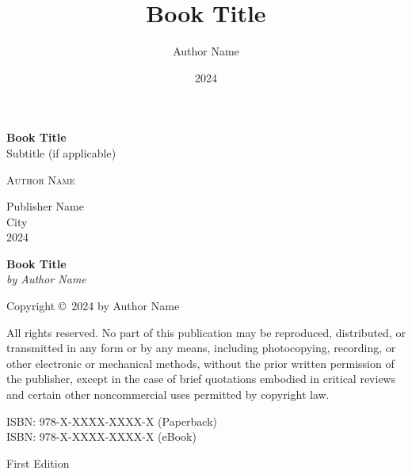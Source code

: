 \documentclass[11pt,a4paper,oneside]{book}
\title{Book Title}
\author{Author Name}
\date{2024}
\begin{document}

\begin{titlepage}
    \centering
    \vspace*{2cm}
    
    {\Huge\bfseries Book Title\\[0.5cm]}
    {\Large Subtitle (if applicable)\\[2cm]}
    
    {\Large\textsc{Author Name}\\[1.5cm]}
    
    \vfill
    
    {\large Publisher Name\\
    City\\
    2024}
\end{titlepage}


\newpage
\thispagestyle{empty}
\null
\vfill

\noindent
\textbf{Book Title}\\
\textit{by Author Name}

\vspace{1cm}

\noindent
Copyright \copyright~2024 by Author Name

\vspace{0.5cm}

\noindent
All rights reserved. No part of this publication may be reproduced, distributed, 
or transmitted in any form or by any means, including photocopying, recording, 
or other electronic or mechanical methods, without the prior written permission 
of the publisher, except in the case of brief quotations embodied in critical 
reviews and certain other noncommercial uses permitted by copyright law.

\vspace{1cm}

\noindent
ISBN: 978-X-XXXX-XXXX-X (Paperback)\\
ISBN: 978-X-XXXX-XXXX-X (eBook)

\vspace{1cm}

\noindent
First Edition

\vspace{1cm}
\end{document}
